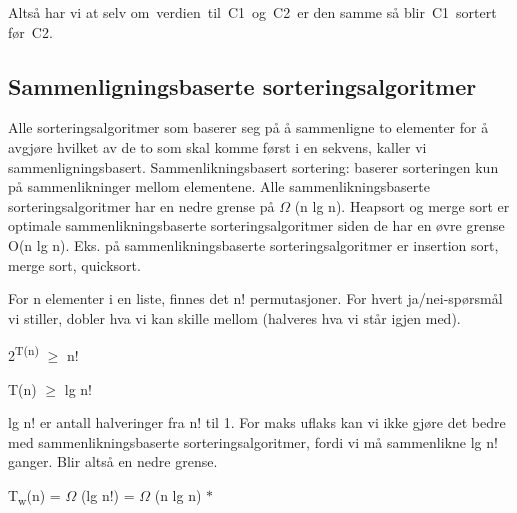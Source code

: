 \documentclass[12pt]{report}
\begin{document}
\begin{Center}
[A1,B1,C1,C2]
\end{Center}\par

\setlength{\parskip}{0.0pt}
Altså har vi at selv om verdien til C1 og C2 er den samme så blir C1 sortert før C2.\par


\vspace{\baselineskip}
\subsection*{Sammenligningsbaserte sorteringsalgoritmer}
Alle sorteringsalgoritmer som baserer seg på å sammenligne to elementer for å avgjøre hvilket av de to som skal komme først i en sekvens, kaller vi sammenligningsbasert. Sammenlikningsbasert sortering: baserer sorteringen kun på sammenlikninger mellom elementene. Alle sammenlikningsbaserte sorteringsalgoritmer har en nedre grense på $ \Omega $ (n lg n). Heapsort og merge sort er optimale sammenlikningsbaserte sorteringsalgoritmer siden de har en øvre grense O(n lg n). Eks. på sammenlikningsbaserte sorteringsalgoritmer er insertion sort, merge sort, quicksort. \par


\vspace{\baselineskip}
For n elementer i en liste, finnes det n! permutasjoner. For hvert ja/nei-spørsmål vi stiller, dobler hva vi kan skille mellom (halveres hva vi står igjen med). \par

\begin{Center}
2\textsuperscript{T(n)} $ \geq $  n!
\end{Center}\par

\begin{Center}
T(n) $ \geq $  lg n!
\end{Center}\par

lg n! er antall halveringer fra n! til 1. For maks uflaks kan vi ikke gjøre det bedre med sammenlikningsbaserte sorteringsalgoritmer, fordi vi må sammenlikne lg n! ganger. Blir altså en nedre grense. \par

\begin{Center}
T\textsubscript{w}(n) = $ \Omega $ (lg n!) = $ \Omega $ (n lg n) $\ast$ 
\end{Center}\par
\end{document}
